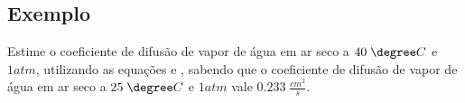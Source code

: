\subsection{Exemplo}
Estime o coeficiente de difusão de vapor de água em ar seco a \(40 \; \degree C\) e \(1 atm\),
utilizando as equações  e
, sabendo que o coeficiente de difusão de vapor de água
em ar seco a \(25 \; \degree C\) e \(1 atm\) vale \(0.233 \; \frac{cm^2}{s}\).

